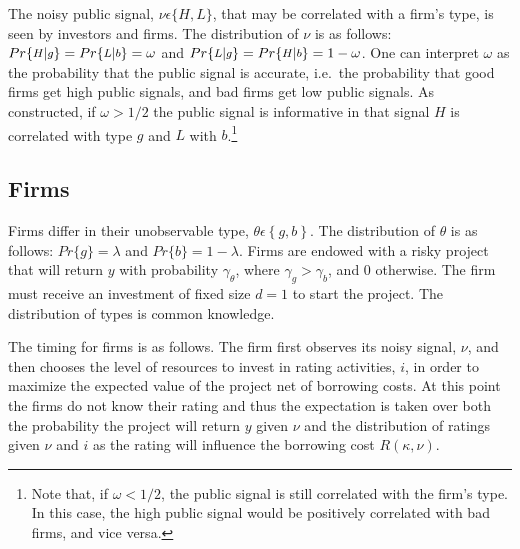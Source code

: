 \documentclass[notitlepage]{article}
\begin{document}
The noisy public signal, $\nu\epsilon \{H,L\}$, that may be correlated with a firm's type, is seen by investors and firms. The distribution of $\nu$ is as follows: $Pr \{\medmath{H} | \medmath{g} \}=Pr \{\medmath{L} | \medmath{b} \}=\omega$ and $Pr \{\medmath{L} | \medmath{g} \}=Pr \{\medmath{H} | \medmath{b} \}=1-\omega$. One can interpret $\omega$ as the probability that the public signal is accurate, i.e.\ the probability that good firms get high public signals, and bad firms get low public signals. As constructed, if $\omega > 1/2$ the public signal is informative in that signal $H$ is correlated with type $g$ and $L$ with $b$.\footnote{Note that, if $\omega<1/2$, the public signal is still correlated with the firm's type. In this case, the high public signal would be positively correlated with bad firms, and vice versa.}

\subsection{Firms}
Firms differ in their unobservable type, $\theta \epsilon \left\{g,b\right\}$. The distribution of $\theta$ is as follows: $Pr\{g\}=\lambda$ and $Pr\{b\}=1-\lambda$. Firms are endowed with a risky project that will return $y$ with probability $\gamma_{\theta}$, where $\gamma_{g}>\gamma_{b}$, and 0 otherwise. The firm must receive an investment of fixed size $d=1$ to start the project. The distribution of types is common knowledge. 

The timing for firms is as follows. The firm first observes its noisy signal, $\nu$, and then chooses the level of resources to invest in rating activities, $i$, in order to maximize the expected value of the project net of borrowing costs. At this point the firms do not know their rating and thus the expectation is taken over both the probability the project will return $y$ given $\nu$ and the distribution of ratings given $\nu$ and $i$ as the rating will influence the borrowing cost $R(\kappa,\nu)$.
\end{document}
